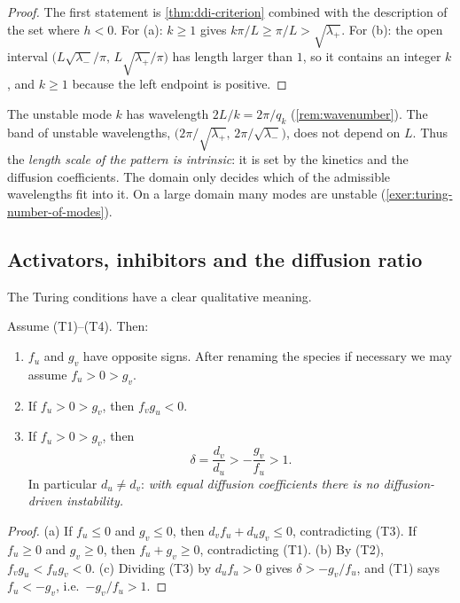 \begin{proof}
The first statement is \cref{thm:ddi-criterion} combined with the description of
the set where $h<0$. For (a): $k\ge1$ gives $k\pi/L\ge\pi/L>\sqrt{\lambda_+}$. For
(b): the open interval $\big(L\sqrt{\lambda_-}/\pi,\,L\sqrt{\lambda_+}/\pi\big)$ has
length larger than $1$, so it contains an integer $k$, and $k\ge1$ because the left
endpoint is positive.
\end{proof}

The unstable mode $k$ has wavelength $2L/k=2\pi/q_k$ (\cref{rem:wavenumber}). The
band of unstable wavelengths, $\big(2\pi/\sqrt{\lambda_+},\,2\pi/\sqrt{\lambda_-}\big)$,
does not depend on $L$. Thus the \emph{length scale of the pattern is intrinsic}: it
is set by the kinetics and the diffusion coefficients. The domain only decides which
of the admissible wavelengths fit into it. On a large domain many modes are
unstable (\cref{exer:turing-number-of-modes}).

\subsection{Activators, inhibitors and the diffusion ratio}

The Turing conditions have a clear qualitative meaning.

\begin{corollary}\label{cor:turing-consequences}
Assume (T1)--(T4). Then:
\begin{enumerate}[label=(\alph*)]
  \item $f_u$ and $g_v$ have opposite signs. After renaming the species if
        necessary we may assume $f_u>0>g_v$.
  \item If $f_u>0>g_v$, then $f_vg_u<0$.
  \item If $f_u>0>g_v$, then
        \begin{equation*}
          \delta = \frac{d_v}{d_u} > -\frac{g_v}{f_u} > 1 .
        \end{equation*}
        In particular $d_u\neq d_v$: \emph{with equal diffusion coefficients there is
        no diffusion-driven instability.}
\end{enumerate}
\end{corollary}

\begin{proof}
(a) If $f_u\le0$ and $g_v\le0$, then $d_vf_u+d_ug_v\le0$, contradicting (T3). If
$f_u\ge0$ and $g_v\ge0$, then $f_u+g_v\ge0$, contradicting (T1). (b) By (T2),
$f_vg_u<f_ug_v<0$. (c) Dividing (T3) by $d_uf_u>0$ gives $\delta>-g_v/f_u$, and (T1)
says $f_u<-g_v$, i.e.\ $-g_v/f_u>1$.
\end{proof}

